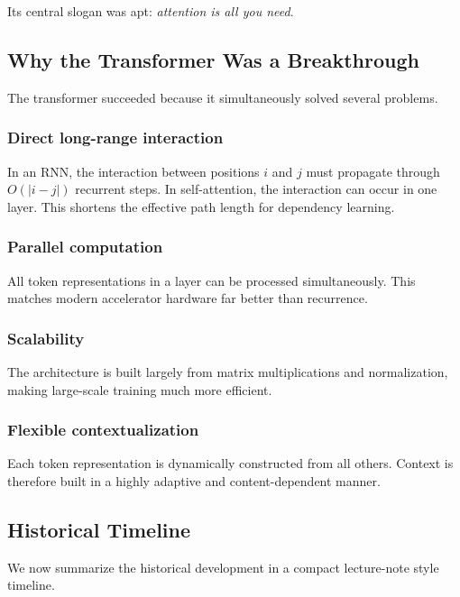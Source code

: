 Its central slogan was apt: \emph{attention is all you need}.

\subsection{Why the Transformer Was a Breakthrough}

The transformer succeeded because it simultaneously solved several problems.

\subsubsection{Direct long-range interaction}

In an RNN, the interaction between positions \(i\) and \(j\) must propagate through \(O(|i-j|)\) recurrent steps. In self-attention, the interaction can occur in one layer. This shortens the effective path length for dependency learning.

\subsubsection{Parallel computation}

All token representations in a layer can be processed simultaneously. This matches modern accelerator hardware far better than recurrence.

\subsubsection{Scalability}

The architecture is built largely from matrix multiplications and normalization, making large-scale training much more efficient.

\subsubsection{Flexible contextualization}

Each token representation is dynamically constructed from all others. Context is therefore built in a highly adaptive and content-dependent manner.

\subsection{Historical Timeline}

We now summarize the historical development in a compact lecture-note style timeline.

